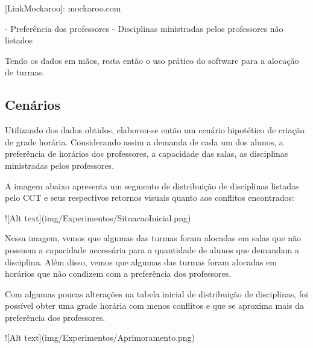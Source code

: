 [LinkMockaroo]: mockaroo.com

- Preferência dos professores
- Disciplinas ministradas pelos professores não listados

Tendo os dados em mãos, resta então o uso prático do software para a alocação de turmas.

\subsection{Cenários}


Utilizando dos dados obtidos, elaborou-se então um cenário hipotético de criação de grade horária. Considerando assim a demanda de cada um dos alunos, a preferência de horários dos professores, a capacidade das salas, as disciplinas ministradas pelos professores.

A imagem abaixo apresenta um segmento de distribuição de disciplinas listadas pelo CCT e seus respectivos retornos visuais quanto aos conflitos encontrados:

![Alt text](img/Experimentos/SituacaoInicial.png)

Nessa imagem, vemos que algumas das turmas foram alocadas em salas que não possuem a capacidade necessária para a quantidade de alunos que demandam a disciplina. Além disso, vemos que algumas das turmas foram alocadas em horários que não condizem com a preferência dos professores.

Com algumas poucas alterações na tabela inicial de distribuição de disciplinas, foi possível obter uma grade horária com menos conflitos e que se aproxima mais da preferência dos professores.

![Alt text](img/Experimentos/Aprimoramento.png)
